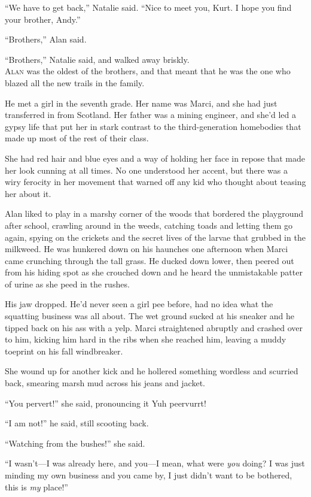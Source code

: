 ``We have to get back,'' Natalie said.  ``Nice to meet you, Kurt.  I
hope you find your brother, Andy.''

``Brothers,'' Alan said.

``Brothers,'' Natalie said, and walked away briskly.
\\
\lettrine[lines=3, lhang=.5, nindent=0pt, findent=2pt]{A}{lan} was the oldest of the brothers, and that meant that he was the
one who blazed all the new trails in the family.

He met a girl in the seventh grade.  Her name was Marci, and she had
just transferred in from Scotland.  Her father was a mining engineer,
and she'd led a gypsy life that put her in stark contrast to the
third-generation homebodies that made up most of the rest of their
class.

She had red hair and blue eyes and a way of holding her face in repose
that made her look cunning at all times.  No one understood her
accent, but there was a wiry ferocity in her movement that warned off
any kid who thought about teasing her about it.

Alan liked to play in a marshy corner of the woods that bordered the
playground after school, crawling around in the weeds, catching toads
and letting them go again, spying on the crickets and the secret lives
of the larvae that grubbed in the milkweed.  He was hunkered down on
his haunches one afternoon when Marci came crunching through the tall
grass.  He ducked down lower, then peered out from his hiding spot as
she crouched down and he heard the unmistakable patter of urine as she
peed in the rushes.

His jaw dropped.  He'd never seen a girl pee before, had no idea what
the squatting business was all about.  The wet ground sucked at his
sneaker and he tipped back on his ass with a yelp.  Marci straightened
abruptly and crashed over to him, kicking him hard in the ribs when
she reached him, leaving a muddy toeprint on his fall windbreaker.

She wound up for another kick and he hollered something wordless and
scurried back, smearing marsh mud across his jeans and jacket.

``You pervert!'' she said, pronouncing it Yuh peervurrt!

``I am not!'' he said, still scooting back.

``Watching from the bushes!'' she said.

``I wasn't---I was already here, and you---I mean, what were
\textit{you} doing?  I was just minding my own business and you came
by, I just didn't want to be bothered, this is \textit{my} place!''

